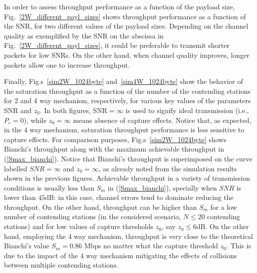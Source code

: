 \documentclass[10pt,onecolumn,a4paper]{IEEEtran}
\begin{document}
In order to assess throughput performance as a function of the
payload size, Fig.~\ref{2W_different_payl_sizes} shows throughput
performance as a function of the SNR, for two different values of
the payload sizes. Depending on the channel quality as exemplified
by the SNR on the abscissa in Fig.~\ref{2W_different_payl_sizes},
it could be preferable to transmit shorter packets for low SNRs.
On the other hand, when channel quality improves, longer packets
allow one to increase throughput.


Finally, Fig.s~\ref{sim2W_1024byte} and~\ref{sim4W_1024byte} show
the behavior of the saturation throughput as a function of the
number of the contending stations for 2 and 4 way mechanism,
respectively, for various key values of the parameters SNR and
$z_0$. In both figures, SNR$=\infty$ is used to signify ideal
transmission (i.e., $P_e=0$), while $z_0=\infty$ means absence of
capture effects. Notice that, as expected, in the 4 way mechanism,
saturation throughput performance is less sensitive to capture
effects. For comparison purposes, Fig.s~\ref{sim2W_1024byte} shows
Bianchi's throughput along with the maximum achievable
throughput in (\ref{Smax_bianchi}). Notice that Bianchi's
throughput is superimposed on the curve labelled $SNR=\infty$ and
$z_0=\infty$, as already noted from the simulation results shown
in the previous figures. Achievable throughput in a variety of
transmission conditions is usually less than $S_m$ in
(\ref{Smax_bianchi}), specially when $SNR$ is lower than $45$dB:
in this case, channel errors tend to dominate reducing the
throughput. On the other hand, throughput can be higher than $S_m$
for a low number of contending stations (in the considered
scenario, $N\le 20$ contending stations) and for low values
of capture thresholds $z_0$, say $z_0\le 6$dB. On the other hand,
employing the 4 way mechanism, throughput is very close to the
theoretical Bianchi's value $S_m=0.86$ Mbps no matter what the capture
threshold $z_0$. This is due to the impact of the 4 way
mechanism mitigating the effects of collisions between
multiple contending stations.
\end{document}

